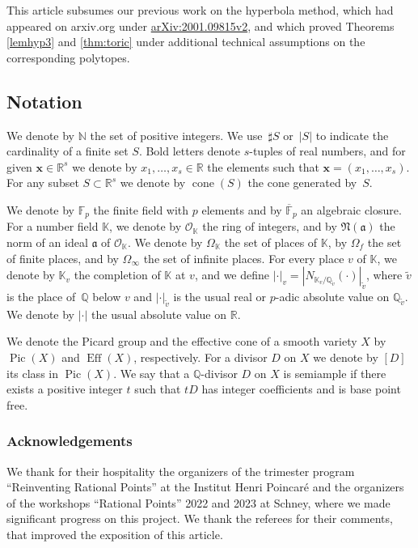 \documentclass[11pt]{article}
\numberwithin{equation}{section}
\newcommand{\bfx}{\boldsymbol{x}}
\newcommand{\OO}{\mathcal{O}}
\newcommand\NN{\mathbb{N}}
\newcommand\RR{\mathbb{R}}
\newcommand\QQ{\mathbb{Q}}
\newcommand\FF{\mathbb{F}}
\newcommand{\KK}{\mathbb{K}}
\newcommand{\idealnorm}{\mathfrak{N}}
\DeclareMathOperator{\cone}{cone}
\DeclareMathOperator{\pic}{Pic}
\DeclareMathOperator{\eff}{Eff}
\theoremstyle{definition}
\numberwithin{theorem}{section}
\providecommand{\eprint}[1]{\href{https://arxiv.org/abs/#1}{arXiv:#1}}
\begin{document}
This article subsumes our previous work on the hyperbola method, which had appeared on arxiv.org under \eprint{2001.09815v2}, and which proved Theorems \ref{lemhyp3} and \ref{thm:toric} under additional technical assumptions on the corresponding polytopes.

\subsection{Notation}
We denote by $\NN$ the set of positive integers.
We use~$\sharp S$ or~$| S |$ to indicate the cardinality of a finite set $S$.
Bold letters denote $s$-tuples of real numbers, and for given $\bfx\in\RR^s$
we denote by $x_1,\dots,x_s\in\RR$ the elements such that $\bfx=(x_1,\dots,x_s)$.
For any subset $S\subset\RR^s$ we denote by $\cone(S)$ the cone generated by~$S$.

We denote by $\FF_p$ the finite field with $p$ elements and by $\overline{\FF}_p$ an algebraic closure. For a number field $\KK$, we denote by $\OO_{\KK}$ the ring of integers,
and by $\idealnorm(\mathfrak a)$ the norm of an ideal $\mathfrak a$ of $\OO_{\KK}$.
We denote by $\Omega_{\KK}$ the set of places of $\KK$, by $\Omega_f$ the set of finite places,
and by $\Omega_\infty$ the set of infinite places.
For every place $v$ of $\KK$, we denote by $\KK_v$ the completion of $\KK$ at $v$,
and we define $|\cdot|_v=|N_{\KK_v/\QQ_{\tilde v}}(\cdot)|_{\tilde v}$,
where $\tilde v$ is the place of~$\QQ$ below $v$ and $|\cdot|_{\tilde v}$ is the usual real
or $p$-adic absolute value on $\QQ_{\tilde v}$.
We denote by $|\cdot|$ the usual absolute value on $\RR$.

We denote the Picard group and the effective cone of a smooth variety $X$
by $\pic(X)$ and $\eff(X)$, respectively.
For a divisor $D$ on $X$ we denote by $[D]$ its class in $\pic(X)$.
We say that a $\QQ$-divisor $D$ on $X$ is semiample if there exists a positive integer $t$
such that $tD$ has integer coefficients and is base point free.

\subsubsection*{Acknowledgements}
We thank for their hospitality the organizers of the trimester program
``Reinventing Rational Points'' at the Institut Henri Poincaré and the organizers of the workshops ``Rational Points'' 2022 and 2023 at Schney, where we made significant progress on this project. We thank the referees for their comments, that improved the exposition of this article.
\end{document}
